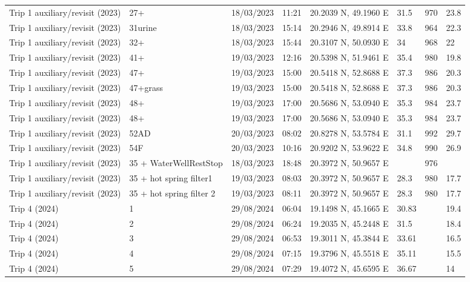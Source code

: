 \begin{scriptsize}
\begin{longtable}{llllllll}
Trip 1 auxiliary/revisit (2023) & 27+ & 18/03/2023 & 11:21 & 20.2039 N, 49.1960 E & 31.5 & 970 & 23.8 \\
Trip 1 auxiliary/revisit (2023) & 31urine & 18/03/2023 & 15:14 & 20.2946 N, 49.8914 E & 33.8 & 964 & 22.3 \\
Trip 1 auxiliary/revisit (2023) & 32+ & 18/03/2023 & 15:44 & 20.3107 N, 50.0930 E & 34 & 968 & 22 \\
Trip 1 auxiliary/revisit (2023) & 41+ & 19/03/2023 & 12:16 & 20.5398 N, 51.9461 E & 35.4 & 980 & 19.8 \\
Trip 1 auxiliary/revisit (2023) & 47+ & 19/03/2023 & 15:00 & 20.5418 N, 52.8688 E & 37.3 & 986 & 20.3 \\
Trip 1 auxiliary/revisit (2023) & 47+grass & 19/03/2023 & 15:00 & 20.5418 N, 52.8688 E & 37.3 & 986 & 20.3 \\
Trip 1 auxiliary/revisit (2023) & 48+ & 19/03/2023 & 17:00 & 20.5686 N, 53.0940 E & 35.3 & 984 & 23.7 \\
Trip 1 auxiliary/revisit (2023) & 48+ & 19/03/2023 & 17:00 & 20.5686 N, 53.0940 E & 35.3 & 984 & 23.7 \\
Trip 1 auxiliary/revisit (2023) & 52AD & 20/03/2023 & 08:02 & 20.8278 N, 53.5784 E & 31.1 & 992 & 29.7 \\
Trip 1 auxiliary/revisit (2023) & 54F & 20/03/2023 & 10:16 & 20.9202 N, 53.9622 E & 34.8 & 990 & 26.9 \\
Trip 1 auxiliary/revisit (2023) & 35 + WaterWellRestStop & 18/03/2023 & 18:48 & 20.3972 N, 50.9657 E & \textemdash{} & 976 & \textemdash{} \\
Trip 1 auxiliary/revisit (2023) & 35 + hot spring filter1 & 19/03/2023 & 08:03 & 20.3972 N, 50.9657 E & 28.3 & 980 & 17.7 \\
Trip 1 auxiliary/revisit (2023) & 35 + hot spring filter 2 & 19/03/2023 & 08:11 & 20.3972 N, 50.9657 E & 28.3 & 980 & 17.7 \\
Trip 4 (2024) & 1 & 29/08/2024 & 06:04 & 19.1498 N, 45.1665 E & 30.83 & \textemdash{} & 19.4 \\
Trip 4 (2024) & 2 & 29/08/2024 & 06:24 & 19.2035 N, 45.2448 E & 31.5 & \textemdash{} & 18.4 \\
Trip 4 (2024) & 3 & 29/08/2024 & 06:53 & 19.3011 N, 45.3844 E & 33.61 & \textemdash{} & 16.5 \\
Trip 4 (2024) & 4 & 29/08/2024 & 07:15 & 19.3796 N, 45.5518 E & 35.11 & \textemdash{} & 15.5 \\
Trip 4 (2024) & 5 & 29/08/2024 & 07:29 & 19.4072 N, 45.6595 E & 36.67 & \textemdash{} & 14 \\

\end{longtable}
\end{scriptsize}
